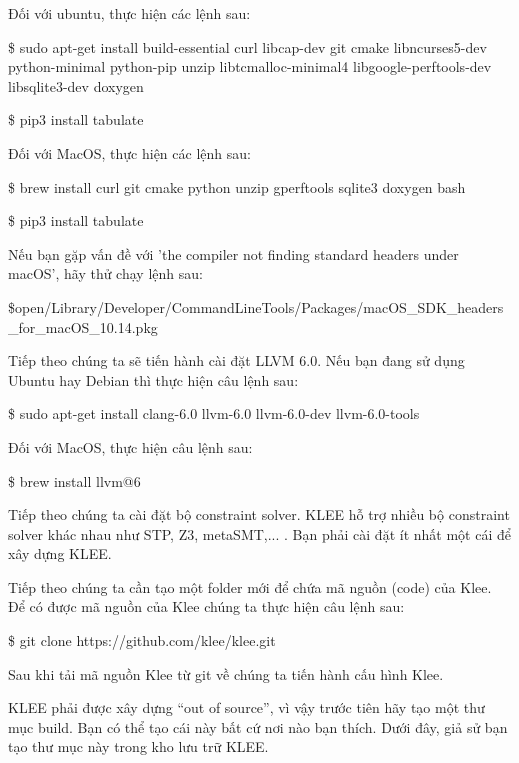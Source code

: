 \documentclass[12pt,a4paper]{report}
\begin{document}
Đối với ubuntu, thực hiện các lệnh sau:

\begin{framed}
\$ sudo apt-get install build-essential curl libcap-dev git cmake libncurses5-dev python-minimal python-pip unzip libtcmalloc-minimal4 libgoogle-perftools-dev libsqlite3-dev doxygen

\$ pip3 install tabulate
\end{framed}

Đối với MacOS, thực hiện các lệnh sau:

\begin{framed}
\$ brew install curl git cmake python unzip gperftools sqlite3 doxygen bash

\$ pip3 install tabulate
\end{framed}

Nếu bạn gặp vấn đề với 'the compiler not finding standard headers under macOS', hãy thử chạy lệnh sau:

\begin{framed}
\$open/Library/Developer/CommandLineTools/Packages/macOS\_SDK\_headers \_for\_macOS\_10.14.pkg
\end{framed}

Tiếp theo chúng ta sẽ tiến hành cài đặt LLVM 6.0. Nếu bạn đang sử dụng Ubuntu hay Debian thì thực hiện câu lệnh sau:

\begin{framed}
\$ sudo apt-get install clang-6.0 llvm-6.0 llvm-6.0-dev llvm-6.0-tools
\end{framed} \newpage

Đối với MacOS, thực hiện câu lệnh sau:

\begin{framed}
\$ brew install llvm@6
\end{framed}

Tiếp theo chúng ta cài đặt bộ constraint solver. KLEE hỗ trợ nhiều bộ constraint solver khác nhau như STP, Z3, metaSMT,... . Bạn phải cài đặt ít nhất một cái để xây dựng KLEE.

Tiếp theo chúng ta cần tạo một folder mới để chứa mã nguồn (code) của Klee. Để có được mã nguồn của Klee chúng ta thực hiện câu lệnh sau:

\begin{framed}
\$ git clone https://github.com/klee/klee.git
\end{framed}

Sau khi tải mã nguồn Klee từ git về chúng ta tiến hành cấu hình Klee.

KLEE phải được xây dựng “out of source”, vì vậy trước tiên hãy tạo một thư mục build. Bạn có thể tạo cái này bất cứ nơi nào bạn thích. Dưới đây, giả sử bạn tạo thư mục này trong kho lưu trữ KLEE.
\end{document}
